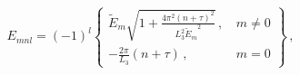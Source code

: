 \begin{equation}
\label{spectral-flow1}
E_{m n l} = 
(-1)^{l} \left\{ \begin{array} {ll} 
\displaystyle
\tilde E_m 
\sqrt{ 1 + \frac{4 \pi^2 (n+\tau)^2}{L_3^2 {\tilde E_m}^2}} 
\, , \, & m \neq 0 \\
\displaystyle
- \frac{2 \pi}{L_3} (n+\tau) \, , \, & m = 0
\end{array} \right\} \, ,
\end{equation}

